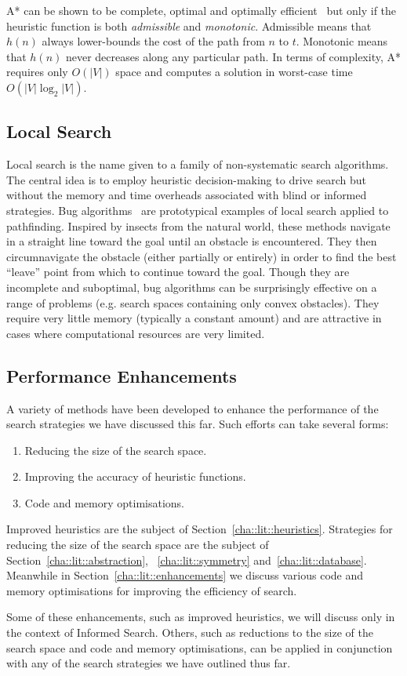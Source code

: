A* can be shown to be complete, optimal and optimally
efficient~\citep{dechter85} but only if the heuristic function is both
\emph{admissible} and \emph{monotonic}. Admissible means that $h(n)$ always
lower-bounds the cost of the path from $n$ to $t$. Monotonic means that $h(n)$
never decreases along any particular path.
In terms of complexity, A* requires only $O(|V|)$ space and computes a solution in 
worst-case time $O(|V|\log_2{|V|})$.

\subsection{Local Search}
\label{cha::lit::search::local}
Local search is the name given to a family of non-systematic search algorithms.
The central idea is to employ heuristic decision-making to drive search but 
without the memory and time overheads associated with blind or informed strategies.
Bug algorithms~\citep{choset05} are prototypical examples of local search
applied to pathfinding.
Inspired by insects from the natural world, these methods navigate in a straight 
line toward the goal until an obstacle is encountered. They then circumnavigate 
the obstacle (either partially or entirely) in order to find the best ``leave'' 
point from which to continue toward the goal.
Though they are incomplete and suboptimal, bug algorithms can be surprisingly
effective on a range of problems (e.g. search spaces containing only convex
obstacles). They require very little memory (typically a constant amount) and
are attractive in cases where computational resources are very limited.

\subsection{Performance Enhancements}
\label{cha::lit::search::enhancements}
A variety of methods have been developed to enhance the performance of the
search strategies we have discussed this far. Such efforts can take several 
forms:

\begin{enumerate}
\item Reducing the size of the search space.
\item Improving the accuracy of heuristic functions.
\item Code and memory optimisations.
\end{enumerate}

Improved heuristics are the subject of Section~\ref{cha::lit::heuristics}.
Strategies for reducing the size of the search space are the subject of
Section~\ref{cha::lit::abstraction}, ~\ref{cha::lit::symmetry} and~\ref{cha::lit::database}.
Meanwhile in Section~\ref{cha::lit::enhancements} we discuss various code
and memory optimisations for improving the efficiency of search.

Some of these enhancements, such as improved heuristics, we will discuss only in the context of
Informed Search. Others, such as reductions to the size of the search space and code and memory
optimisations, can be applied in conjunction with any of the search strategies we have outlined thus
far.
